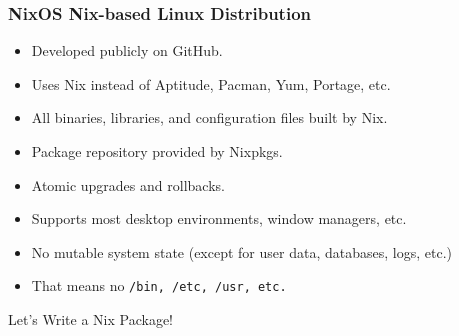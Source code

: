 \documentclass{beamer}
\begin{document}
\begin{frame}
\frametitle{NixOS \textemdash Nix-based Linux Distribution}
\begin{itemize}
\item Developed publicly on GitHub.
\item Uses Nix instead of Aptitude, Pacman, Yum, Portage, etc.
\item All binaries, libraries, and configuration files built by Nix.
\item Package repository provided by Nixpkgs.
\item Atomic upgrades and rollbacks.
\item Supports most desktop environments, window managers, etc.
\item No mutable system state (except for user data, databases, logs, etc.)
\item That means no \texttt{/bin, /etc, /usr, etc.}
\end{itemize}
\end{frame}

\begin{frame}
\begin{center}
\Huge Let's Write a Nix Package!
\end{center}
\end{frame}
\end{document}
